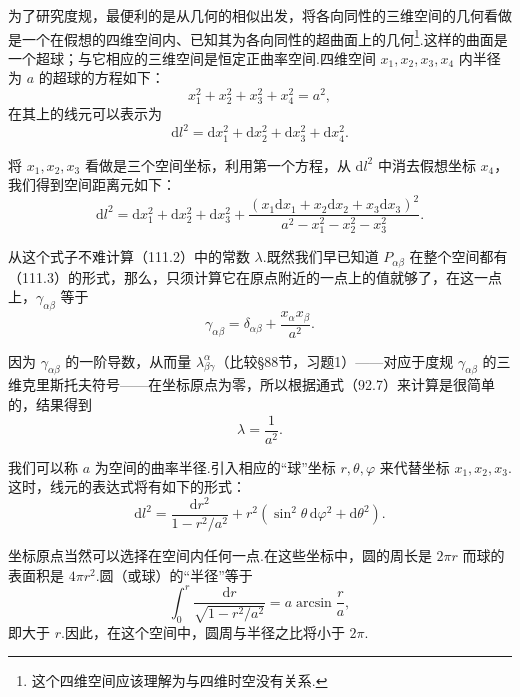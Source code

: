 为了研究度规，最便利的是从几何的相似出发，将各向同性的三维空间的几何看做是一个在假想的四维空间内、已知其为各向同性的超曲面上的几何\footnote{这个四维空间应该理解为与四维时空没有关系.}.这样的曲面是一个超球；与它相应的三维空间是恒定正曲率空间.四维空间 $x_{1},x_{2},x_{3},x_{4}$ 内半径为 $a$ 的超球的方程如下：
\begin{equation*}
  x_{1}^{2}+x_{2}^{2}+x_{3}^{2}+x_{4}^{2}=a^{2},
\end{equation*}
在其上的线元可以表示为
\begin{equation*}
  \mathrm{d}l^{2}=\mathrm{d}x_{1}^{2}+\mathrm{d}x_{2}^{2}
  +\mathrm{d}x_{3}^{2}+\mathrm{d}x_{4}^{2}.
\end{equation*}

将 $x_{1},x_{2},x_{3}$ 看做是三个空间坐标，利用第一个方程，从 $\mathrm{d}l^{2}$ 中消去假想坐标 $x_{4}$，我们得到空间距离元如下：
\begin{equation}
  \mathrm{d}l^{2}=\mathrm{d}x_{1}^{2}+\mathrm{d}x_{2}^{2}+\mathrm{d}x_{3}^{2}
  +\frac{(x_{1}\mathrm{d}x_{1}+x_{2}\mathrm{d}x_{2}+x_{3}\mathrm{d}x_{3})^{2}}
  {a^{2}-x_{1}^{2}-x_{2}^{2}-x_{3}^{2}}.
\end{equation}

从这个式子不难计算（111.2）中的常数 $\lambda$.既然我们早已知道 $P_{\alpha\beta}$ 在整个空间都有（111.3）的形式，那么，只须计算它在原点附近的一点上的值就够了，在这一点上，$\gamma_{\alpha\beta}$ 等于
\begin{equation*}
  \gamma_{\alpha\beta}=\delta_{\alpha\beta}+\frac{x_{\alpha}x_{\beta}}{a^{2}}.
\end{equation*}

因为 $\gamma_{\alpha\beta}$ 的一阶导数，从而量 $\lambda_{\beta\gamma}^{\alpha}$（比较§88节，习题1）——对应于度规 $\gamma_{\alpha\beta}$ 的三维克里斯托夫符号——在坐标原点为零，所以根据通式（92.7）来计算是很简单的，结果得到
\begin{equation}
  \lambda=\frac{1}{a^{2}}.
\end{equation}

我们可以称 $a$ 为空间的曲率半径.引入相应的“球”坐标 $r,\theta,\varphi$ 来代替坐标 $x_{1},x_{2},x_{3}$.这时，线元的表达式将有如下的形式：
\begin{equation}
  \mathrm{d}l^{2}=\frac{\mathrm{d}r^{2}}{1-r^{2}/a^{2}}
  +r^{2}(\sin^{2}\theta\,\mathrm{d}\varphi^{2}+\mathrm{d}\theta^{2}).
\end{equation}

坐标原点当然可以选择在空间内任何一点.在这些坐标中，圆的周长是 $2\pi r$ 而球的表面积是 $4\pi r^{2}$.圆（或球）的“半径”等于
\begin{equation*}
  \int_{0}^{r}\frac{\mathrm{d}r}{\sqrt{1-r^{2}/a^{2}}}=a\arcsin\frac{r}{a},
\end{equation*}
即大于 $r$.因此，在这个空间中，圆周与半径之比将小于 $2\pi$.

